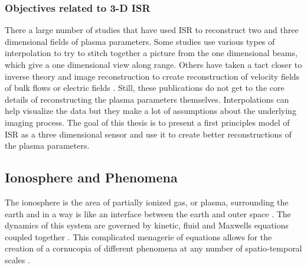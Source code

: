 \subsubsection{Objectives related to 3-D ISR}
There a large number of studies that have used ISR to reconstruct two and three dimensional fields of plasma parameters. Some studies use various types of interpolation to try to stitch together a picture from the one dimensional beams, which give a one dimensional view along range\cite{Semeter2009738,Butler:2013ul,Semeter:2005fo}. Others have taken a tact closer to inverse theory and image reconstruction to create reconstruction of velocity fields of bulk flows or electric fields \cite{butler:imagingfregiondrifts,RDS:RDS20195}. Still, these publications do not get to the core details of reconstructing the plasma parameters themselves. Interpolations can help visualize the data but they make a lot of assumptions about the underlying imaging process. The goal of this thesis is to present a first principles model of ISR as a three dimensional sensor and use it to create better reconstructions of the plasma parameters.

\subsection{Ionosphere and Phenomena}
The ionosphere is the area of partially ionized gas, or plasma, surrounding the earth and in a way is like an interface between the earth and outer space \cite{kellybook}. The dynamics of this system are governed by kinetic, fluid and Maxwells equations coupled together \cite{schunk2004ionospheres}. This complicated menagerie of equations allows for the creation of a cornucopia of different phenomena at any number of spatio-temporal scales \cite{Semeter:2008hs,Semeter2009738}.


